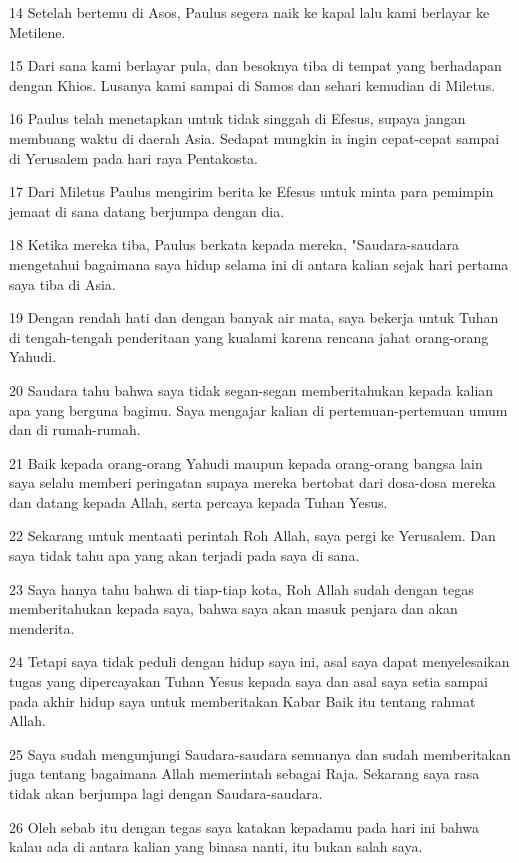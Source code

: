 \par 14 Setelah bertemu di Asos, Paulus segera naik ke kapal lalu kami berlayar ke Metilene.
\par 15 Dari sana kami berlayar pula, dan besoknya tiba di tempat yang berhadapan dengan Khios. Lusanya kami sampai di Samos dan sehari kemudian di Miletus.
\par 16 Paulus telah menetapkan untuk tidak singgah di Efesus, supaya jangan membuang waktu di daerah Asia. Sedapat mungkin ia ingin cepat-cepat sampai di Yerusalem pada hari raya Pentakosta.
\par 17 Dari Miletus Paulus mengirim berita ke Efesus untuk minta para pemimpin jemaat di sana datang berjumpa dengan dia.
\par 18 Ketika mereka tiba, Paulus berkata kepada mereka, "Saudara-saudara mengetahui bagaimana saya hidup selama ini di antara kalian sejak hari pertama saya tiba di Asia.
\par 19 Dengan rendah hati dan dengan banyak air mata, saya bekerja untuk Tuhan di tengah-tengah penderitaan yang kualami karena rencana jahat orang-orang Yahudi.
\par 20 Saudara tahu bahwa saya tidak segan-segan memberitahukan kepada kalian apa yang berguna bagimu. Saya mengajar kalian di pertemuan-pertemuan umum dan di rumah-rumah.
\par 21 Baik kepada orang-orang Yahudi maupun kepada orang-orang bangsa lain saya selalu memberi peringatan supaya mereka bertobat dari dosa-dosa mereka dan datang kepada Allah, serta percaya kepada Tuhan Yesus.
\par 22 Sekarang untuk mentaati perintah Roh Allah, saya pergi ke Yerusalem. Dan saya tidak tahu apa yang akan terjadi pada saya di sana.
\par 23 Saya hanya tahu bahwa di tiap-tiap kota, Roh Allah sudah dengan tegas memberitahukan kepada saya, bahwa saya akan masuk penjara dan akan menderita.
\par 24 Tetapi saya tidak peduli dengan hidup saya ini, asal saya dapat menyelesaikan tugas yang dipercayakan Tuhan Yesus kepada saya dan asal saya setia sampai pada akhir hidup saya untuk memberitakan Kabar Baik itu tentang rahmat Allah.
\par 25 Saya sudah mengunjungi Saudara-saudara semuanya dan sudah memberitakan juga tentang bagaimana Allah memerintah sebagai Raja. Sekarang saya rasa tidak akan berjumpa lagi dengan Saudara-saudara.
\par 26 Oleh sebab itu dengan tegas saya katakan kepadamu pada hari ini bahwa kalau ada di antara kalian yang binasa nanti, itu bukan salah saya.
